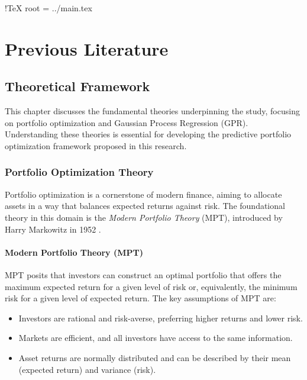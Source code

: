 !TeX root = ../main.tex

\chapter{Previous Literature}\label{chapter:previous literature}

\section{Theoretical Framework}

This chapter discusses the fundamental theories underpinning the study, focusing on portfolio optimization and Gaussian Process Regression (GPR). Understanding these theories is essential for developing the predictive portfolio optimization framework proposed in this research.

\subsection{Portfolio Optimization Theory}

Portfolio optimization is a cornerstone of modern finance, aiming to allocate assets in a way that balances expected returns against risk. The foundational theory in this domain is the \textit{Modern Portfolio Theory} (MPT), introduced by Harry Markowitz in 1952 \cite{markowitz1952portfolio}.

\subsubsection{Modern Portfolio Theory (MPT)}

MPT posits that investors can construct an optimal portfolio that offers the maximum expected return for a given level of risk or, equivalently, the minimum risk for a given level of expected return. The key assumptions of MPT are:

\begin{itemize}
    \item Investors are rational and risk-averse, preferring higher returns and lower risk.
    \item Markets are efficient, and all investors have access to the same information.
    \item Asset returns are normally distributed and can be described by their mean (expected return) and variance (risk).
\end{itemize}

